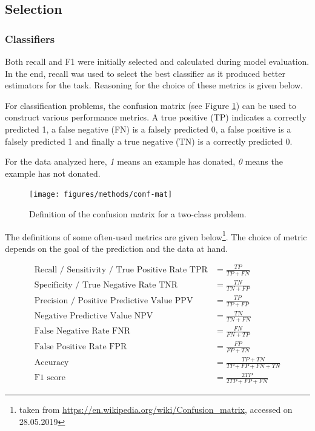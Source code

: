 \documentclass[
  11pt,
  a4paper,
  DIV=12,captions=tableheading,oneside,titlepage]{scrbook}
\begin{document}
\hypertarget{selection}{%
\subsection{Selection}\label{selection}}

\hypertarget{classifiers}{%
\subsubsection{Classifiers}\label{classifiers}}

Both recall and F1 were initially selected and calculated during model evaluation. In the end, recall was used to select the best classifier as it produced better estimators for the task. Reasoning for the choice of these metrics is given below.

For classification problems, the confusion matrix (see Figure \ref{fig:conf-mat-plot}) can be used to construct various performance metrics. A true positive (TP) indicates a correctly predicted 1, a false negative (FN) is a falsely predicted 0, a false positive is a falsely predicted 1 and finally a true negative (TN) is a correctly predicted 0.

For the data analyzed here, \emph{1} means an example has donated, \emph{0} means the example has not donated.



\begin{figure}

{\centering \texttt{[image: figures/methods/conf-mat]} 

}

\caption{Definition of the confusion matrix for a two-class problem.}\label{fig:conf-mat-plot}
\end{figure}

The definitions of some often-used metrics are given below\footnote{taken from \url{https://en.wikipedia.org/wiki/Confusion_matrix}, accessed on 28.05.2019}. The choice of metric depends on the goal of the prediction and the data at hand.

\begin{align*}
\text{Recall / Sensitivity / True Positive Rate TPR} &= \frac{TP}{TP + FN} \\
\text{Specificity / True Negative Rate TNR} &= \frac{TN}{TN+FP} \\ 
\text{Precision / Positive Predictive Value PPV} &= \frac{TP}{TP + FP}\\
\text{Negative Predictive Value NPV} &= \frac{TN}{TN+FN}\\
\text{False Negative Rate FNR} &= \frac{FN}{FN+TP}\\
\text{False Positive Rate FPR} &= \frac{FP}{FP+TN}\\
\text{Accuracy} &= \frac{TP + TN}{TP + FP + FN + TN} \\
\text{F1 score} &= \frac{2TP}{2TP+FP+FN}
\end{align*}
\end{document}
